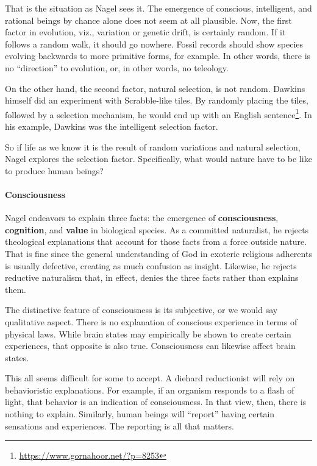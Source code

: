 That is the situation as Nagel sees it. The emergence of conscious, intelligent, and rational beings by chance alone
does not seem at all plausible. Now, the first factor in evolution, viz., variation or genetic drift, is certainly
random. If it follows a random walk, it should go nowhere. Fossil records should show species evolving backwards to
more primitive forms, for example. In other words, there is no “direction” to evolution, or, in other words, no
teleology.

On the other hand, the second factor, natural selection, is not random. Dawkins himself did an experiment with
Scrabble-like tiles. By randomly placing the tiles, followed by a selection mechanism, he would end up with an English
sentence\footnote{\url{https://www.gornahoor.net/?p=8253}}. In his example, Dawkins was the intelligent selection factor.

So if life as we know it is the result of random variations and natural selection, Nagel explores the selection factor.
Specifically, what would nature have to be like to produce human beings?

\paragraph{Consciousness}
Nagel endeavors to explain three facts: the emergence of \textbf{consciousness}, \textbf{cognition}, and \textbf{value}
in biological species. As a committed naturalist, he rejects theological explanations that account for those facts from
a force outside nature. That is fine since the general understanding of God in exoteric religious adherents is usually
defective, creating as much confusion as insight. Likewise, he rejects reductive naturalism that, in effect, denies the
three facts rather than explains them.

The distinctive feature of consciousness is its subjective, or we would say qualitative aspect. There is no explanation
of conscious experience in terms of physical laws. While brain states may empirically be shown to create certain
experiences, that opposite is also true. Consciousness can likewise affect brain states.

This all seems difficult for some to accept. A diehard reductionist will rely on behavioristic explanations. For
example, if an organism responds to a flash of light, that behavior is an indication of consciousness. In that view,
then, there is nothing to explain. Similarly, human beings will “report” having certain sensations and experiences. The
reporting is all that matters.

